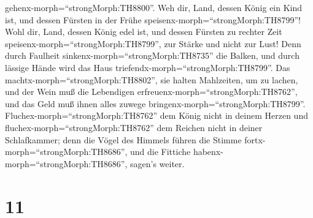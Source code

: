 gehenx-morph=``strongMorph:TH8800''.  Weh dir, Land, dessen
König ein Kind ist, und dessen Fürsten in der Frühe
speisenx-morph=``strongMorph:TH8799''!  Wohl dir, Land,
dessen König edel ist, und dessen Fürsten zu rechter Zeit
speisenx-morph=``strongMorph:TH8799'', zur Stärke und nicht zur Lust!
 Denn durch Faulheit sinkenx-morph=``strongMorph:TH8735''
die Balken, und durch lässige Hände wird das Haus
triefendx-morph=``strongMorph:TH8799''.  Das
machtx-morph=``strongMorph:TH8802'', sie halten Mahlzeiten, um zu
lachen, und der Wein muß die Lebendigen
erfreuenx-morph=``strongMorph:TH8762'', und das Geld muß ihnen alles
zuwege bringenx-morph=``strongMorph:TH8799''. 
Fluchex-morph=``strongMorph:TH8762'' dem König nicht in deinem Herzen
und fluchex-morph=``strongMorph:TH8762'' dem Reichen nicht in deiner
Schlafkammer; denn die Vögel des Himmels führen die Stimme
fortx-morph=``strongMorph:TH8686'', und die Fittiche
habenx-morph=``strongMorph:TH8686'', sagen's weiter.

\hypertarget{section-10}{%
\section{11}\label{section-10}}


